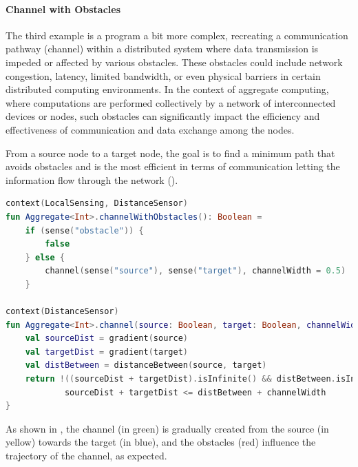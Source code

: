 \paragraph{Channel with Obstacles}
The third example is a program a bit more complex, recreating a communication pathway (channel) within a distributed
system where data transmission is impeded or affected by various obstacles.
These obstacles could include network congestion, latency, limited bandwidth, or even physical barriers in certain
distributed computing environments.
In the context of aggregate computing, where computations are performed collectively by a network of interconnected
devices or nodes, such obstacles can significantly impact the efficiency and effectiveness of communication and data exchange among the nodes.

From a source node to a target node, the goal is to find a minimum path that avoids obstacles and is the most efficient
in terms of communication letting the information flow through the network ().

\begin{lstlisting}[language=kt, caption={Channel with Obstacles code example}, label={lst:channel-with-obstacles-example}]
context(LocalSensing, DistanceSensor)
fun Aggregate<Int>.channelWithObstacles(): Boolean =
    if (sense("obstacle")) {
        false
    } else {
        channel(sense("source"), sense("target"), channelWidth = 0.5)
    }

context(DistanceSensor)
fun Aggregate<Int>.channel(source: Boolean, target: Boolean, channelWidth: Double): Boolean {
    val sourceDist = gradient(source)
    val targetDist = gradient(target)
    val distBetween = distanceBetween(source, target)
    return !((sourceDist + targetDist).isInfinite() && distBetween.isInfinite()) &&
            sourceDist + targetDist <= distBetween + channelWidth
}
\end{lstlisting}

As shown in , the channel (in green) is gradually created from the source (in yellow) towards the
target (in blue), and the obstacles (red) influence the trajectory of the channel, as expected.

